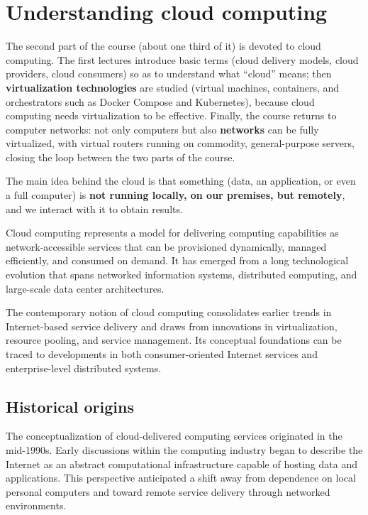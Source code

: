 \documentclass[11pt,a4paper,openany]{report}
\begin{document}
\section{Understanding cloud computing}

The second part of the course (about one third of it) is devoted to cloud computing. The first lectures introduce basic terms (cloud delivery models, cloud providers, cloud consumers) so as to understand what ``cloud'' means; then \textbf{virtualization technologies} are studied (virtual machines, containers, and orchestrators such as Docker Compose and Kubernetes), because cloud computing needs virtualization to be effective. Finally, the course returns to computer networks: not only computers but also \textbf{networks} can be fully virtualized, with virtual routers running on commodity, general-purpose servers, closing the loop between the two parts of the course.

The main idea behind the cloud is that something (data, an application, or even a full computer) is \textbf{not running locally, on our premises, but remotely}, and we interact with it to obtain results.

Cloud computing represents a model for delivering computing capabilities as network-accessible services that can be provisioned dynamically, managed efficiently, and consumed on demand. It has emerged from a long technological evolution that spans networked information systems, distributed computing, and large-scale data center architectures.

The contemporary notion of cloud computing consolidates earlier trends in Internet-based service delivery and draws from innovations in virtualization, resource pooling, and service management. Its conceptual foundations can be traced to developments in both consumer-oriented Internet services and enterprise-level distributed systems.

\subsection{Historical origins}

The conceptualization of cloud-delivered computing services originated in the mid-1990s. Early discussions within the computing industry began to describe the Internet as an abstract computational infrastructure capable of hosting data and applications. This perspective anticipated a shift away from dependence on local personal computers and toward remote service delivery through networked environments.
\end{document}
